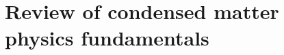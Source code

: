\chapter[Review of fundamentals]{Review of condensed matter physics fundamentals}
\label{ch:review}


